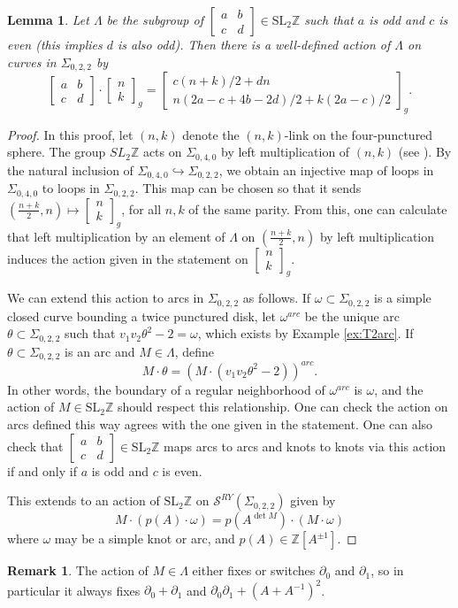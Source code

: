 \documentclass{article}
\newcommand{\del}{\partial}
\newcommand{\Z}{\mathbb{Z}}
\newcommand{\SL}{\mathrm{SL}}
\newcommand{\fourmat}[4]{\begin{bmatrix}#1&#2\\#3&#4\end{bmatrix}}
\newcommand{\lilmat}[4]{\left[\begin{smallmatrix}#1&#2\\#3&#4\end{smallmatrix}\right]}
\newcommand{\SRY}{\mathcal{S}^{RY}}
\newcommand{\san}{\Sigma_{0,2,2}}
\newcommand{\twos}[2]{\left[\begin{smallmatrix}#1\\#2\end{smallmatrix}\right]}
\newcommand{\two}[2]{\begin{bmatrix}#1\\#2\end{bmatrix}}
\newtheorem{lemma}[theorem]{Lemma}
\theoremstyle{definition}
\newtheorem{remark}[theorem]{Remark}
\renewcommand{\san}{\Sigma_{0, 2, 2}}
\renewcommand{\SRY}{\ensuremath{ \mathcal S^{RY}}}
\begin{document}
\begin{lemma}\label{lem:sl2z-action}
    Let $\Lambda$ be the subgroup of $\lilmat{a}{b}{c}{d}\in \SL_2\Z$ such that $a$ is odd and $c$ is even (this implies $d$ is also odd). Then there is a well-defined action of $\Lambda$ on curves in $\san$ by
\[
\fourmat{a}{b}{c}{d}\cdot \two{n}{k}_g=\two{c(n+k)/2+dn}{n(2a-c+4b-2d)/2+k(2a-c)/2}_g.
\]
\end{lemma}
\begin{proof}
In this proof, let $(n,k)$ denote the $(n,k)$-link on the four-punctured sphere. The group $SL_2\Z$ acts on $\Sigma_{0,4,0}$ by left multiplication of $(n,k)$ (see \cite{Rhea4puncsphere}). By the natural inclusion of $\Sigma_{0,4,0}\hookrightarrow \san$, we obtain an injective map of loops in $\Sigma_{0,4,0}$ to loops in $\san$. This map can be chosen so that it sends $(\frac{n+k}{2},n)\mapsto \twos{n}{k}_g$, for all $n,k$ of the same parity. From this, one can calculate that left multiplication by an element of $\Lambda$ on $(\frac{n+k}{2},n)$ by left multiplication induces the action given in the statement on $ \twos{n}{k}_g$.

We can extend this action to arcs in $\san$ as follows. If $\omega\subset \san$ is a simple closed curve bounding a twice punctured disk, let $\omega^{arc}$ be the unique arc $\theta\subset \san$ such that $v_1v_2\theta^2-2=\omega$, which exists by Example \ref{ex:T2arc}. 
If $\theta\subset\san$ is an arc and $M\in \Lambda$, define
\[
    M\cdot \theta=(M\cdot (v_1v_2\theta^2-2))^{arc}.
\]
In other words,  the boundary of a regular neighborhood of $\omega^{arc}$ is $\omega$, and the action of $M \in \SL_2\Z$ should respect this relationship. 
One can check the action on arcs defined this way agrees with the one given in the statement. One can also check that $\lilmat{a}{b}{c}{d}\in \SL_2\Z$ maps arcs to arcs and knots to knots via this action if and only if $a$ is odd and $c$ is even.

This extends to an action of $\SL_2\Z$ on $\SRY(\san)$ given by
    \[
    M\cdot (p(A)\cdot \omega)=p(A^{\det M})\cdot (M\cdot \omega)
    \]
where $\omega$ may be a simple knot or arc, and $p(A)\in \Z[A^{\pm1}]$. 

 \end{proof}

\begin{remark}
    The action of $M\in \Lambda$ either fixes or switches $\del_0$ and $\del_1$, so in particular it always fixes $\del_0+\del_1$ and $\del_0\del_1+(A+A^{-1})^2$.
\end{remark}
\end{document}
